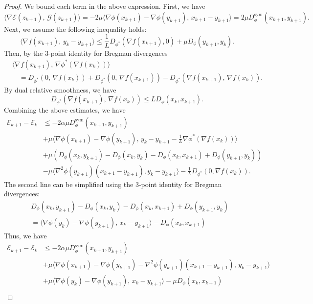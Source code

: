 \documentclass{article}
\theoremstyle{plain}
\theoremstyle{definition}
\theoremstyle{remark}
\begin{document}
\begin{proof}
We bound each term in the above expression. First, we have
\[
\langle \nabla \mathcal{E}(z_{k+1}),\,\mathcal{G}(z_{k+1})\rangle
=-2\mu\langle \nabla\phi(x_{k+1})-\nabla\phi(y_{k+1}),\,x_{k+1}-y_{k+1}\rangle=2\mu D_\phi^{\text{sym}}(x_{k+1},y_{k+1}).
\]
Next, we assume the following inequality holds:
\[
\langle \nabla f(x_{k+1}),\,y_k-y_{k+1}\rangle
\le
\frac{1}{L} D_{\phi^*}(\nabla f(x_{k+1}),0)+\mu D_\phi(y_{k+1},y_k).
\]
Then, by the 3-point identity for Bregman divergences
\[
\begin{aligned}
&\langle \nabla f(x_{k+1}),\, \nabla\phi^*(\nabla f(x_{k}))
  \rangle \\
&\quad= D_{\phi^*}\!\left(0,\,\nabla f(x_{k})\right)
  + D_{\phi^*}\!\left(0,\,\nabla f(x_{k+1})\right)
  - D_{\phi^*}\!\left(\nabla f(x_{k+1}),\,\nabla f(x_{k})\right).
\end{aligned}
\]
By dual relative smoothness, we have
\[
D_{\phi^*}\!\left(\nabla f(x_{k+1}),\,\nabla f(x_{k})\right)
\le
L D_\phi(x_{k},x_{k+1}).
\]
Combining the above estimates, we have
\[
\begin{aligned}
\mathcal{E}_{k+1}-\mathcal{E}_k
&\le
-2\alpha\mu D_\phi^{\text{sym}}(x_{k+1},y_{k+1})\\
&+\mu\langle \nabla\phi(x_{k+1})-\nabla\phi(y_{k+1}),\,y_{k}-y_{k+1}-\frac{1}{L}\nabla \phi^*(\nabla f(x_{k}))\rangle\\
&+\mu(D_\phi(x_k,y_{k+1})-D_\phi(x_k,y_k)-D_\phi(x_k,x_{k+1})+D_\phi(y_{k+1},y_k))\\
&-\mu\langle \nabla^2\phi(y_{k+1})(x_{k+1}-y_{k+1}),y_k-y_{k+1}\rangle - \frac{1}{L}D_{\phi^*}(0,\nabla f(x_{k})).
\end{aligned}
\]
The second line can be simplified using the 3-point identity for Bregman divergences:
\[
\begin{aligned}
&D_\phi(x_k,y_{k+1})-D_\phi(x_k,y_k)-D_\phi(x_k,x_{k+1})+D_\phi(y_{k+1},y_k)\\
&{}= \langle \nabla\phi(y_k)-\nabla\phi(y_{k+1}),\, x_k - y_{k+1}\rangle 
- D_\phi(x_k, x_{k+1})
\end{aligned}
\]
Thus, we have
\[
\begin{aligned}
\mathcal{E}_{k+1}-\mathcal{E}_k
&\le
-2\alpha\mu D_\phi^{\text{sym}}(x_{k+1},y_{k+1})\\
&+\mu\langle \nabla\phi(x_{k+1})-\nabla\phi(y_{k+1})-\nabla^2\phi(y_{k+1})(x_{k+1}-y_{k+1}),\,y_{k}-y_{k+1}\rangle\\
&+\mu\langle \nabla\phi(y_k)-\nabla\phi(y_{k+1}),\, x_k - y_{k+1}\rangle 
- \mu D_\phi(x_k, x_{k+1})\\

\end{aligned}\]
\end{proof}
\end{document}
